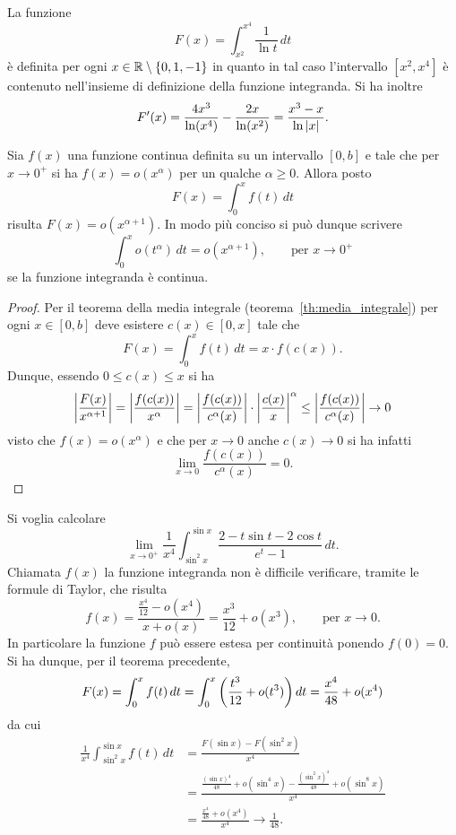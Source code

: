 \begin{example}
La funzione
\[
 F(x) = \int_{x^2}^{x^4} \frac{1}{\ln t}\, dt
\]
è definita per ogni $x\in {\mathbb R}\setminus{\left\{ 0,1,-1 \right\}}$ 
in quanto in tal caso l'intervallo
$[x^2,x^4]$ è contenuto nell'insieme di definizione
della funzione integranda.
Si ha inoltre
\[
F'(x)
= \frac{4x^3}{\ln (x^4)} - \frac{2x}{\ln (x^2)}
= \frac{x^3-x}{\ln {\left|x\right|}}.
\]
\end{example}

\begin{theorem}
Sia $f(x)$ una funzione continua definita
su un intervallo $[0,b]$ e tale che
per $x\to 0^+$ si ha
$f(x) = o(x^\alpha)$ per un qualche $\alpha\ge 0$.
Allora posto
\[
  F(x) = \int_0^x f(t)\, dt
\]
risulta $F(x) = o(x^{\alpha+1})$.
In modo più conciso si può dunque scrivere
\[
  \int_0^x o(t^\alpha)\, dt = o (x^{\alpha+1}),
  \qquad \text{per $x\to 0^+$}
\]
se la funzione integranda è continua.
\end{theorem}
%
\begin{proof}
Per il teorema della media integrale (teorema~\ref{th:media_integrale})
per ogni $x\in [0,b]$ deve esistere $c(x)\in[0,x]$ tale che
\[
  F(x)
  = \int_0^x f(t)\, dt
  = x \cdot f(c(x)).
\]
Dunque, essendo $0\le c(x)\le x$ si ha
\[
{\left|\frac{F(x)}{x^{\alpha+1}}\right|}
= {\left|\frac{f(c(x))}{x^\alpha}\right|}
= {\left|\frac{f(c(x))}{c^\alpha(x)}\right|}
\cdot {\left|\frac{c(x)}{x}\right|}^\alpha
\le {\left|\frac{f(c(x))}{c^\alpha(x)}\right|} \to 0
\]
visto che $f(x) = o(x^\alpha)$
e che per $x\to 0$ anche $c(x)\to 0$
si ha infatti
\[
  \lim_{x\to 0} \frac{f(c(x))}{c^\alpha(x)} = 0.
\]
\end{proof}

\begin{example}
Si voglia calcolare
\[
  \lim_{x\to 0^+} \frac{1}{x^4}\int_{\sin^2 x}^{\sin x} \frac{2- t\sin t - 2 \cos t}{e^t - 1}\, dt.
\]
Chiamata $f(x)$ la funzione integranda non è difficile
verificare, tramite le formule di Taylor, che risulta
\[
  f(x)
  = \frac{\frac{x^4}{12}-o(x^4)}{x+o(x)}
  = \frac{x^3}{12} + o(x^3), \qquad \text{per $x\to 0$}.
\]
In particolare la funzione $f$ può essere estesa per
continuità ponendo $f(0)=0$.
Si ha dunque, per il teorema precedente,
\[
  F(x) = \int_0^x f(t)\, dt
  = \int_0^x {\left( \frac{t^3}{12}+o(t^3) \right)}\, dt
  = \frac{x^4}{48} + o(x^4)
\]
da cui
\begin{align*}
 \frac{1}{x^4} \int_{\sin^2 x}^{\sin x}
 f(t) \, dt
 &= \frac{F(\sin x) - F(\sin^2 x)}{x^4}\\
 &= \frac{\frac{(\sin x)^4}{48} + o(\sin^4 x) - \frac{(\sin^2 x)^4}{48} + o(\sin^8 x)}{x^4} \\
 &= \frac{\frac{x^4}{48} + o(x^4)}{x^4} \to \frac{1}{48}.
\end{align*}
\end{example}

